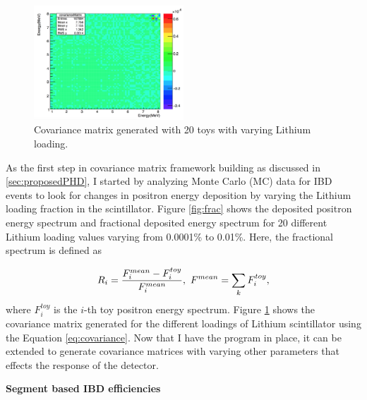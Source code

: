 \documentclass[11pt]{article}
\numberwithin{equation}{section}
\begin{document}
\begin{figure}[h]
\centering
\includegraphics*[width=0.5\textwidth]{./covariance.PNG}
\caption[Covariance matrix]{Covariance matrix generated with 20 toys with varying Lithium loading.}
\label{fig:covariance}
\end{figure}


\noindent
As the first step in covariance matrix framework building as discussed in \ref{sec:proposedPHD}, I started by analyzing Monte Carlo (MC) data for IBD events to look for changes in positron energy deposition by varying the Lithium loading fraction in the scintillator. Figure \ref{fig:frac} shows the deposited positron energy spectrum and fractional deposited energy spectrum for 20 different Lithium loading values varying from 0.0001\% to 0.01\%. Here, the fractional spectrum is defined as 

\begin{equation}
R_{i}= \frac{F^{mean}_{i} - F^{toy}_{i}}{F^{mean}_{i}}, \text{ } 
\newline
F^{mean} = \sum\limits_{k} F^{toy}_{i},
\end{equation}
where $F^{toy}_{i}$ is the $i$-th toy positron energy spectrum. 
Figure \ref{fig:covariance} shows the covariance matrix generated for the different loadings of Lithium scintillator using the Equation \ref{eq:covariance}.
Now that I have the program in place, it can be extended to generate covariance matrices with varying other parameters that effects the response of the detector. 

\noindent
\textbf{Segment based IBD efficiencies}
\end{document}
